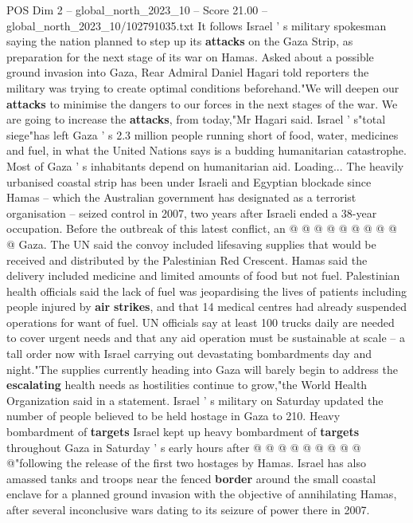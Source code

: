 \begin{textsample}{POS Dim 2 – global\_north\_2023\_10 – Score 21.00 – global\_north\_2023\_10/102791035.txt}  \label{ex:f2_pos_150}
It follows Israel ' s military spokesman saying the nation planned to step up its \textbf{attacks} on the Gaza Strip, as preparation for the next stage of its war on Hamas.
Asked about a possible ground invasion into Gaza, Rear Admiral Daniel Hagari told reporters the military was trying to create optimal conditions beforehand."We will deepen our \textbf{attacks} to minimise the dangers to our forces in the next stages of the war.
We are going to increase the \textbf{attacks}, from today,"Mr Hagari said.
Israel ' s"total siege"has left Gaza ' s 2.3 million people running short of food, water, medicines and fuel, in what the United Nations says is a budding humanitarian catastrophe.
Most of Gaza ' s inhabitants depend on humanitarian aid.
Loading...
The heavily urbanised coastal strip has been under Israeli and Egyptian blockade since Hamas -- which the Australian government has designated as a terrorist organisation -- seized control in 2007, two years after Israeli ended a 38-year occupation.
Before the outbreak of this latest conflict, an @ @ @ @ @ @ @ @ @ @ Gaza.
The UN said the convoy included lifesaving supplies that would be received and distributed by the Palestinian Red Crescent.
Hamas said the delivery included medicine and limited amounts of food but not fuel.
Palestinian health officials said the lack of fuel was jeopardising the lives of patients including people injured by \textbf{air} \textbf{strikes}, and that 14 medical centres had already suspended operations for want of fuel.
UN officials say at least 100 trucks daily are needed to cover urgent needs and that any aid operation must be sustainable at scale -- a tall order now with Israel carrying out devastating bombardments day and night."The supplies currently heading into Gaza will barely begin to address the \textbf{escalating} health needs as hostilities continue to grow,"the World Health Organization said in a statement.
Israel ' s military on Saturday updated the number of people believed to be held hostage in Gaza to 210.
Heavy bombardment of \textbf{targets} Israel kept up heavy bombardment of \textbf{targets} throughout Gaza in Saturday ' s early hours after @ @ @ @ @ @ @ @ @ @"following the release of the first two hostages by Hamas.
Israel has also amassed tanks and troops near the fenced \textbf{border} around the small coastal enclave for a planned ground invasion with the objective of annihilating Hamas, after several inconclusive wars dating to its seizure of power there in 2007.

\end{textsample}
